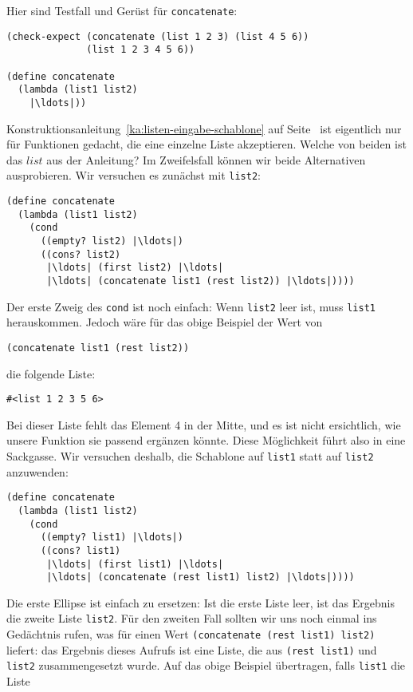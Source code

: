 Hier sind Testfall und Gerüst für \lstinline{concatenate}:
% 
\begin{lstlisting}
(check-expect (concatenate (list 1 2 3) (list 4 5 6))
              (list 1 2 3 4 5 6))

(define concatenate
  (lambda (list1 list2)
    |\ldots|))
\end{lstlisting}
%
Konstruktionsanleitung~\ref{ka:listen-eingabe-schablone} auf Seite~\pageref{ka:listen-eingabe-schablone} ist
eigentlich nur für Funktionen gedacht, die eine einzelne Liste
akzeptieren.  Welche von beiden ist das $\mathit{list}$ aus der Anleitung?  Im
Zweifelsfall können wir beide Alternativen ausprobieren.  Wir
versuchen es zunächst mit \lstinline{list2}:
%
\begin{lstlisting}
(define concatenate
  (lambda (list1 list2)
    (cond
      ((empty? list2) |\ldots|)
      ((cons? list2) 
       |\ldots| (first list2) |\ldots|
       |\ldots| (concatenate list1 (rest list2)) |\ldots|))))
\end{lstlisting}
%
Der erste Zweig des \lstinline{cond} ist noch einfach: Wenn
\lstinline{list2} leer ist, muss \lstinline{list1} herauskommen.  Jedoch wäre für
das obige Beispiel der Wert von
%
\begin{lstlisting}
(concatenate list1 (rest list2))
\end{lstlisting}
%
die
folgende Liste:
%
\begin{lstlisting}
#<list 1 2 3 5 6>
\end{lstlisting}
%
Bei dieser Liste fehlt das
Element 4 in der Mitte, und es ist nicht ersichtlich, wie unsere Funktion
sie passend ergänzen könnte.  Diese
Möglichkeit führt also in eine Sackgasse. Wir versuchen deshalb, die Schablone  auf
\lstinline{list1} 
 statt auf \lstinline{list2} anzuwenden:
%
\begin{lstlisting}
(define concatenate
  (lambda (list1 list2)
    (cond
      ((empty? list1) |\ldots|)
      ((cons? list1) 
       |\ldots| (first list1) |\ldots|
       |\ldots| (concatenate (rest list1) list2) |\ldots|))))
\end{lstlisting}
%
Die erste Ellipse ist einfach zu ersetzen:  Ist die erste Liste
leer, ist das Ergebnis die zweite Liste \lstinline{list2}.  Für den
zweiten Fall sollten wir uns noch einmal ins Gedächtnis rufen,
was für einen Wert \lstinline{(concatenate (rest list1) list2)} liefert: das Ergebnis
dieses Aufrufs ist eine
Liste, die aus \lstinline{(rest list1)} und \lstinline{list2} zusammengesetzt
wurde.  Auf das obige Beispiel übertragen, falls \lstinline{list1} die Liste
